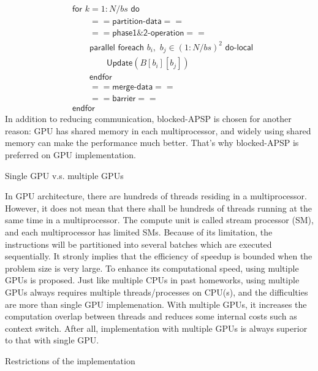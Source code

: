 \documentclass[12pt]{article}
\makeatletter
\renewenvironment{itemize}
{\list{$\bullet$}{\leftmargin\z@ \labelwidth\z@ \itemindent-\leftmargin
\let\makelabel\descriptionlabel}}
{\endlist}
\makeatother
\begin{document}
\begin{itemize}
\begin{flushleft}
        \begin{align*}
            &\mathsf{for} \,\, k = 1:N/bs \,\, \mathsf{do} \\
            &\quad \quad \mathsf{==partition\text{-}data==} \\
            &\quad \quad \mathsf{==phase1\&2\text{-}operation==} \\
            &\quad \quad \mathsf{parallel} \,\, \mathsf{foreach} \,\, b_i, \,\, b_j \in (1:N/bs)^2 \,\, \mathsf{do\text{-}local} \\
            &\quad \quad \quad \quad \mathsf{Update} (B[b_i][b_j]) \\
            &\quad \quad \mathsf{endfor} \\
            &\quad \quad \mathsf{==merge\text{-}data==} \\
            &\quad \quad \mathsf{==barrier==} \\
            &\mathsf{endfor}
        \end{align*}
        In addition to reducing communication, blocked-APSP is chosen for another reason: GPU has shared memory in each multiprocessor, and widely using shared memory can make the performance much better. That's why blocked-APSP is preferred on GPU implementation.
    \end{flushleft}
    \item Single GPU v.s. multiple GPUs
    \begin{flushleft}
        In GPU architecture, there are hundreds of threads residing in a multiprocessor. However, it does not mean that there shall be hundreds of threads running at the same time in a multiprocessor. The compute unit is called stream processor (SM), and each multiprocessor has limited SMs. Because of its limitation, the instructions will be partitioned into several batches which are executed sequentially. It stronly implies that the efficiency of speedup is bounded when the problem size is very large. To enhance its computational speed, using multiple GPUs is proposed. Just like multiple CPUs in past homeworks, using multiple GPUs always requires multiple threads/processes on CPU(s), and the difficulties are more than single GPU implemenation. With multiple GPUs, it increases the computation overlap between threads and reduces some internal costs such as context switch. After all, implementation with multiple GPUs is always superior to that with single GPU.
    \end{flushleft}
    \item Restrictions of the implementation

\end{itemize}
\end{document}
